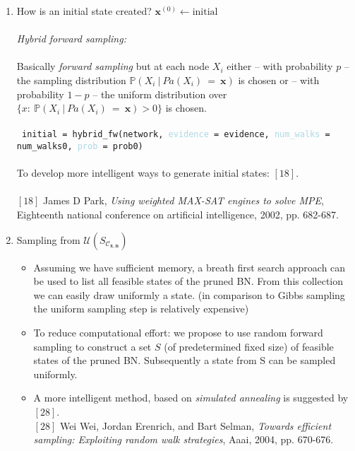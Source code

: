 \documentclass{amsart}
\newcommand{\bfx}{{\mathbf{x}}}
\newcommand{\lightblue}[1]{\textcolor{lightblue}{#1}}
\theoremstyle{plain}
\theoremstyle{remark}
\theoremstyle{plain}
\renewcommand{\P}{{\mathbb P}}
\newcommand{\C}{{\mathcal C}}
\newcommand{\U}{{\mathcal{U}}}
\begin{document}
\begin{enumerate}[1)]
\item How is an initial state created? $\mathbf{x}^{(0)} \leftarrow \text{initial}$\\ \\ 
\textit{Hybrid forward sampling:} \\ \\ 
Basically \textit{forward sampling} but at each node $X_i$ either -- with probability $p$ -- the sampling distribution $\P(X_i\ |\ Pa(X_i)\ =\ \bfx )$ is chosen or -- with probability $1-p$ -- the uniform distribution over $\{x:\  \P(X_i\ |\ Pa(X_i)\ =\ \bfx)>0 \}$ is chosen. \\ \\
 \texttt{
initial = hybrid\_fw(network, \lightblue{evidence} = evidence, \lightblue{num\_walks} = num\_walks0, \lightblue{prob} = prob0) \\ \\
} 
To develop more intelligent ways to generate initial states: $[18]$. \\ \\
$[18]$ James D Park, \textit{Using weighted MAX-SAT engines to solve MPE}, Eighteenth national conference on artificial intelligence, 2002, pp. 682-687. \\
\item Sampling from $\U(S_{\C_{\mathbf{x,n}}})$
\begin{itemize}
\item Assuming we have sufficient memory, a breath first search approach can be used to list all feasible states of the pruned BN. From this collection we can easily draw uniformly a state. (in comparison to Gibbs sampling the uniform sampling step is relatively expensive)
\item To reduce computational effort: we propose to use random forward sampling to construct a set $S$ (of predetermined fixed size) of feasible states of the pruned BN. Subsequently a state from S can be sampled uniformly.
\item A more intelligent method, based on \textit{simulated annealing} is suggested by $[28]$. \\

$[28]$ Wei Wei, Jordan Erenrich, and Bart Selman, \textit{Towards efficient sampling: Exploiting random walk strategies}, Aaai, 2004, pp. 670-676.
\end{itemize}
\end{enumerate}
\end{document}
